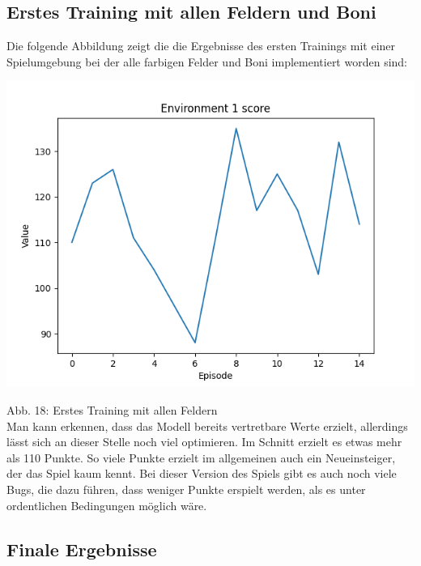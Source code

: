 \subsection{Erstes Training mit allen Feldern und Boni}
\begin{minipage}{\linewidth}
	Die folgende Abbildung zeigt die die Ergebnisse des ersten Trainings mit einer Spielumgebung bei der alle farbigen Felder und Boni implementiert worden sind:
	
	\vspace{0.5cm}
	\includegraphics[width=1\textwidth]{Bilder/firsttrainingwithallfields}
	
	Abb. 18: Erstes Training mit allen Feldern\\
	
Man kann erkennen, dass das Modell bereits vertretbare Werte erzielt, allerdings lässt sich an dieser Stelle noch viel optimieren. Im Schnitt erzielt es etwas mehr als 110 Punkte. So viele Punkte erzielt im allgemeinen auch ein Neueinsteiger, der das Spiel kaum kennt. Bei dieser Version des Spiels gibt es auch noch viele Bugs, die dazu führen, dass weniger Punkte erspielt werden, als es unter ordentlichen Bedingungen möglich wäre.
\end{minipage}
\subsection{Finale Ergebnisse}
